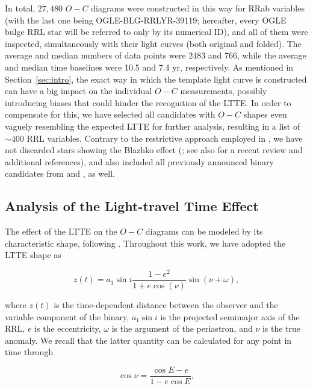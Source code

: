 \documentclass[twocolumn,times]{aastex63}
\begin{document}
In total, $27{,}480$ $O-C$ diagrams were constructed in this way for RRab variables (with the last one being OGLE-BLG-RRLYR-39119; hereafter,
every OGLE bulge RRL star will be referred to only by its numerical ID), and all of them were inspected, simultaneously with
their light curves (both original and folded). The average and median numbers of data points were 2483 and 766, while the average
and median time baselines were 10.5 and 7.4 yr, respectively.
As mentioned in Section~\ref{sec:intro}, the exact way in which the template light curve
is constructed can have a big impact on the individual $O-C$ measurements, possibly introducing biases that could hinder
the recognition of the LTTE. In order to compensate for this, we have selected all candidates with $O-C$ shapes even vaguely
resembling the expected LTTE for further analysis, resulting in a list of $\sim400$ RRL variables.
Contrary to the restrictive approach employed in \citet{2015MNRAS.449L.113H},
we have not discarded stars showing the Blazhko effect (\citealt{1907AN....175..325B}; see also \citealt{2016pas..conf...22S}
for a recent review and additional references), and also included all previously announced binary candidates from
\citet{2015MNRAS.449L.113H,2018pas6.conf..248H} and \citet{2019MNRAS.487L...1P}, as well. 


\subsection{Analysis of the Light-travel Time Effect} \label{subsec:bin}

The effect of the LTTE on the $O-C$ diagrams can be modeled by its characteristic shape, following \citet{1952ApJ...116..211I,1959AJ.....64..149I}.
Throughout this work, we have adopted the LTTE shape as

\begin{equation}
    \label{eq:lte}
    z(t) = a_1\sin i \frac{1-e^2}{1+e \cos(\nu)} \sin (\nu + \omega),
\end{equation}

\noindent where $z(t)$ is the time-dependent distance between the observer and the variable component of the binary,
$a_1 \sin i$ is the projected semimajor axis of the RRL, $e$ is the eccentricity, $\omega$ is the argument of the periastron,
and $\nu$ is the true anomaly. We recall that the latter quantity can be calculated for any point in time through

\begin{equation}
    \label{eq:true_anomaly}
    \cos \nu = \frac{\cos E - e}{1-e \cos E},
\end{equation}
\end{document}
